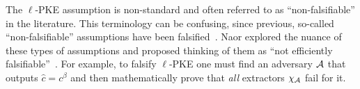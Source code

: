The $\ell$-PKE assumption is non-standard and often referred to as ``non-falsifiable'' in the literature.
This terminology can be confusing, since previous, so-called ``non-falsifiable'' assumptions have been falsified~\cite{BP04c}.
Naor explored the nuance of these types of assumptions and proposed thinking of them as ``not efficiently falsifiable''~\cite{Naor03On}.
For example, to falsify $\ell$-PKE one must find an adversary $\mathcal{A}$ that outputs $\hat{c} = c^\beta$ and then mathematically prove that \textit{all} extractors $\chi_\mathcal{A}$ fail for it.
